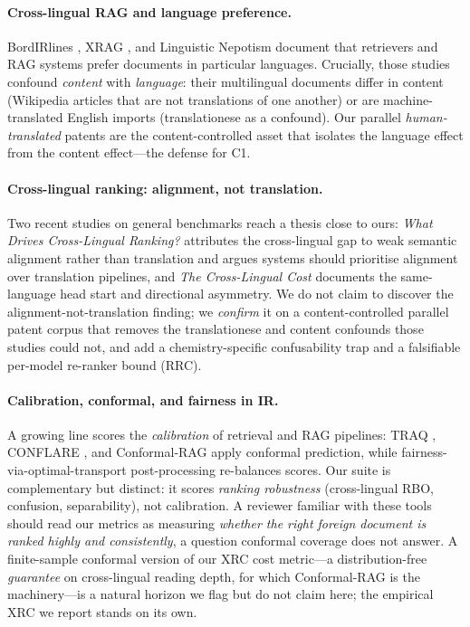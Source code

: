 \documentclass[11pt]{article}
\begin{document}
\paragraph{Cross-lingual RAG and language preference.}
BordIRlines \citep{bordirlines2024}, XRAG \citep{xrag2025}, and Linguistic
Nepotism \citep{nepotism2025} document that retrievers and RAG systems prefer
documents in particular languages. Crucially, those studies confound
\emph{content} with \emph{language}: their multilingual documents differ in
content (Wikipedia articles that are not translations of one another) or are
machine-translated English imports (translationese as a confound). Our parallel
\emph{human-translated} patents are the content-controlled asset that isolates
the language effect from the content effect---the defense for C1.

\paragraph{Cross-lingual ranking: alignment, not translation.}
Two recent studies on general benchmarks reach a thesis close to ours:
\emph{What Drives Cross-Lingual Ranking?} \citep{whatdrivesclir2025} attributes
the cross-lingual gap to weak semantic alignment rather than translation and
argues systems should prioritise alignment over translation pipelines, and
\emph{The Cross-Lingual Cost} \citep{crosslingualcost2025} documents the
same-language head start and directional asymmetry. We do not claim to discover
the alignment-not-translation finding; we \emph{confirm} it on a
content-controlled parallel patent corpus that removes the translationese and
content confounds those studies could not, and add a chemistry-specific
confusability trap and a falsifiable per-model re-ranker bound (RRC).

\paragraph{Calibration, conformal, and fairness in IR.}
A growing line scores the \emph{calibration} of retrieval and RAG pipelines:
TRAQ \citep{traq2023}, CONFLARE \citep{conflare2024}, and Conformal-RAG
\citep{conformalrag2025} apply conformal prediction, while
fairness-via-optimal-transport post-processing
\citep{fairnessot2023,buyl2022optimal} re-balances scores. Our suite is
complementary but distinct: it scores \emph{ranking robustness} (cross-lingual
RBO, confusion, separability), not calibration. A reviewer familiar with these
tools should read our metrics as measuring \emph{whether the right foreign
document is ranked highly and consistently}, a question conformal coverage does
not answer. A finite-sample conformal version of our XRC cost metric---a
distribution-free \emph{guarantee} on cross-lingual reading depth, for which
Conformal-RAG \citep{conformalrag2025} is the machinery---is a natural horizon
we flag but do not claim here; the empirical XRC we report stands on its own.
\end{document}
